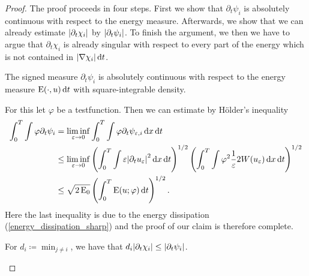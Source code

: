 \begin{proof}
	The proof proceeds in four steps. First we show that $ \partial_{ t } 
	\psi_{ i } $ is absolutely continuous with respect to the energy measure. 
	Afterwards, we show that we can already estimate $ \abs{ \partial_{ t } 
	\chi_{ i } } $ by $ \abs{ \partial_{ t } \psi_{ i } } $. To finish the 
	argument, we then we have to argue that $ \partial_{ t } \chi_{ i } $ is 
	already singular with respect to every part of the energy which is not 
	contained in $ \abs{ \nabla \chi_{ i } } \dd{ t } $.
	
	\begin{description}[wide=0pt]
		\item[Step 1:] The signed measure $ \partial_{  t } \psi_{ i } $ is 
		absolutely continuous with respect to the energy measure $ \operatorname{E} ( 
		\cdot, u ) \dd{t } $ with square-integrable density.
		
		For this let $ \varphi $ be a testfunction. Then we can estimate by 
		Hölder's inequality
		\begin{align*}
			\int_{ 0 }^{ T }
			\int
			\varphi
			\partial_{ t } \psi_{ i }
			& =
			\liminf_{ \varepsilon \to 0 }
			\int_{ 0 }^{ T }
			\int
			\varphi
			\partial_{ t } \psi_{ \varepsilon ,i }
			\dd{ x }
			\dd{ t }
			\\
			& \leq
			\liminf_{ \varepsilon \to 0 }
			\left(
			\int_{ 0 }^{ T }
			\int
			\varepsilon 
			\abs{ \partial_{ t } u_{ \varepsilon } }^{ 2 }
			\dd{ x }
			\dd{ t }
			\right)^{ 1/2 }
			\left(
			\int_{ 0 }^{ T }
			\int
			\varphi^{ 2 }
			\frac{ 1 }{ \varepsilon }
			2 W ( u_{ \varepsilon } )
			\dd{ x }
			\dd{ t }
			\right)^{ 1/2 }
			\\
			& \leq
			\sqrt{ 2 \operatorname{E}_{ 0 } }
			\left(
			\int_{ 0 }^{ T }
			\operatorname{E} ( u ; \varphi )
			\dd{ t }
			\right)^{ 1/2 }.
		\end{align*}
		Here the last inequality is due to the energy dissipation 
		(\ref{energy_dissipation_sharp})
		and the proof of our claim is therefore complete.
		
		\item[Step 2:] For $ d_{ i } \coloneqq \min_{ j \neq i } $, we have 
		that $ d_{ i } \abs{ \partial_{ t } \chi_{ i } } \leq \abs{ \partial_{ 
		t } \psi_{ i } } $.
		

\end{description}
\end{proof}

